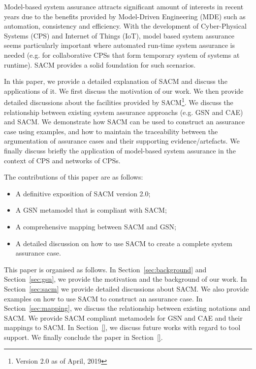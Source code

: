 Model-based system assurance attracts significant amount of interests in recent years due to the benefits provided by Model-Driven Engineering (MDE) such as automation, consistency and efficiency. With the development of Cyber-Physical Systems (CPS) and Internet of Things (IoT), model based system assurance seems particularly important where automated run-time system assurance is needed (e.g. for collaborative CPSs that form temporary system of systems at runtime). SACM provides a solid foundation for such scenarios.



In this paper, we provide a detailed explanation of SACM and discuss the applications of it. We first discuss the motivation of our work. We then provide detailed discussions about the facilities provided by SACM\footnote{Version 2.0 as of April, 2019}. We discuss the relationship between existing system assurance approachs (e.g. GSN and CAE) and SACM. We demonstrate how SACM can be used to construct an assurance case using examples, and how to maintain the traceability between the argumentation of assurance cases and their supporting evidence/artefacts. We finally discuss briefly the application of model-based system assurance in the context of CPS and networks of CPSs.

The contributions of this paper are as follows:
\begin{itemize}
	\item A definitive exposition of SACM version 2.0;
	\item A GSN metamodel that is compliant with SACM;
	\item A comprehensive mapping between SACM and GSN;
	\item A detailed discussion on how to use SACM to create a complete system assurance case.
\end{itemize}

This paper is organised as follows. In Section~\ref{sec:background} and Section~\ref{sec:gsn}, we provide the motivation and the background of our work. In Section~\ref{sec:sacm} we provide detailed discussions about SACM. We also provide examples on how to use SACM to construct an assurance case. In Section~\ref{sec:mapping}, we discuss the relationship between existing notations and SACM. We provide SACM compliant metamodels for GSN and CAE and their mappings to SACM. In Section~\ref{}, we discuss future works with regard to tool support. We finally conclude the paper in Section~\ref{}.

